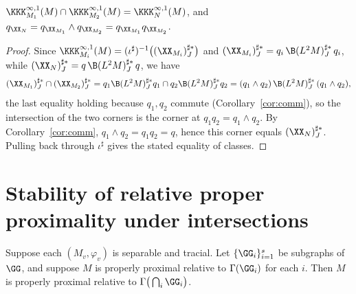 \begin{corollary}\label{cor:intersection}
$\KKK^{\infty,1}_{M_1}(M)\cap\KKK^{\infty,1}_{M_2}(M)=\KKK^{\infty,1}_{N}(M)$, and
$q_{\XX_N}=q_{\XX_{M_1}}\wedge q_{\XX_{M_2}}=q_{\XX_{M_1}}q_{\XX_{M_2}}$.
\end{corollary}

\begin{proof}
Since $\KKK^{\infty,1}_{M_i}(M)=(\iota^\sharp)^{-1}\big((\XX_{M_i})^{\sharp*}_J\big)$ and
$(\XX_{M_i})^{\sharp*}_J=q_i\,\B(L^2M)^{\sharp*}_J\,q_i$, while
$(\XX_N)^{\sharp*}_J=q\,\B(L^2M)^{\sharp*}_J\,q$, we have
\[
(\XX_{M_1})^{\sharp*}_J\cap(\XX_{M_2})^{\sharp*}_J
= q_1\B(L^2M)^{\sharp*}_J q_1\cap q_2\B(L^2M)^{\sharp*}_J q_2
= (q_1\wedge q_2)\,\B(L^2M)^{\sharp*}_J\,(q_1\wedge q_2),
\]
the last equality holding because $q_1,q_2$ commute (Corollary~\ref{cor:comm}), so the
intersection of the two corners is the corner at $q_1q_2=q_1\wedge q_2$. By
Corollary~\ref{cor:comm}, $q_1\wedge q_2=q_1q_2=q$, hence this corner equals
$(\XX_N)^{\sharp*}_J$. Pulling back through $\iota^\sharp$ gives the stated equality of
classes.
\end{proof}

\section{Stability of relative proper proximality under intersections}

\begin{lemma}\label{lem:intersection-pp}
Suppose each $(M_v,\varphi_v)$ is separable and tracial. Let $\{\GG_i\}_{i=1}^s$ be subgraphs
of $\GG$, and suppose $M$ is properly proximal relative to $\Gamma(\GG_i)$ for each $i$. Then
$M$ is properly proximal relative to $\Gamma\big(\bigcap_i\GG_i\big)$.
\end{lemma}

